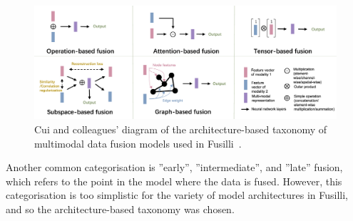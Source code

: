 
\begin{figure}
    \centering
    \includegraphics[width=\textwidth]{figures/cui_diagram}
    \caption{Cui and colleagues' diagram of the architecture-based taxonomy of multimodal data fusion models used in Fusilli~\cite{cuiDeepMultimodalFusion2022}.}
    \label{fig:fusilli_taxonomy}
\end{figure}


Another common categorisation is ''early'', ''intermediate'', and ''late'' fusion, which refers to the point in the model where the data is fused.
However, this categorisation is too simplistic for the variety of model architectures in Fusilli, and so the architecture-based taxonomy was chosen.

